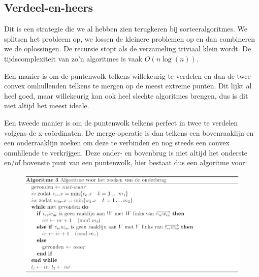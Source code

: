 \documentclass[12pt,a4paper]{article}
\begin{document}
	

	\subsection{Verdeel-en-heers}
	Dit is een strategie die we al hebben zien terugkeren bij sorteeralgoritmes. We splitsen het probleem op, we lossen de kleinere problemen op en dan combineren we de oplossingen. De recursie stopt als de verzameling triviaal klein wordt. De tijdscomplexiteit van zo'n algoritmes is vaak $O(n\log(n))$. 
	
	Een manier is om de puntenwolk telkens willekeurig te verdelen en dan de twee convex omhullenden telkens te mergen op de meest extreme punten. Dit lijkt al heel goed, maar willekeurig kan ook heel slechte algoritmes brengen, dus is dit niet altijd het meest ideale. 
	
	Een tweede manier is om de puntenwolk telkens perfect in twee te verdelen volgens de x-coördinaten. De merge-operatie is dan telkens een bovenraaklijn en een onderraaklijn zoeken om deze te verbinden en nog steeds een convex omuhllende te verkrijgen. Deze onder- en bovenbrug is niet altijd het onderste en/of bovenste punt van een puntenwolk, hier bestaat dus een algoritme voor: 
	
	\begin{figure}[h]
		\centering
		\includegraphics[width=0.9\linewidth]{afbeeldingen/verdeel-en-heers-convex}
		\label{fig:verdeel-en-heers-convex}
	\end{figure}
	
\end{document}
